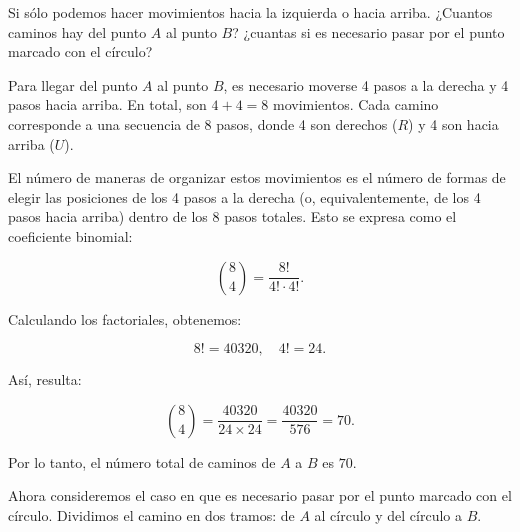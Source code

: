 \documentclass{article}
\begin{document}
\begin{enumerate}
\begin{center}
		
			
		\end{center}
		
			Si sólo podemos hacer movimientos hacia la izquierda o hacia arriba. ¿Cuantos caminos hay del punto $A$ al punto $B$? 			¿cuantas si es necesario pasar por el punto marcado con el círculo?


Para llegar del punto \(A\) al punto \(B\), es necesario moverse 4 pasos a la derecha y 4 pasos hacia arriba. En total, son \(4 + 4 = 8\) movimientos. Cada camino corresponde a una secuencia de 8 pasos, donde 4 son derechos (\(R\)) y 4 son hacia arriba (\(U\)).

El número de maneras de organizar estos movimientos es el número de formas de elegir las posiciones de los 4 pasos a la derecha (o, equivalentemente, de los 4 pasos hacia arriba) dentro de los 8 pasos totales. Esto se expresa como el coeficiente binomial:

\[
\binom{8}{4} = \frac{8!}{4! \cdot 4!}.
\]

Calculando los factoriales, obtenemos:

\[
8! = 40320, \quad 4! = 24.
\]

Así, resulta:

\[
\binom{8}{4} = \frac{40320}{24 \times 24} = \frac{40320}{576} = 70.
\]

Por lo tanto, el número total de caminos de \(A\) a \(B\) es \(70\).

\medskip

Ahora consideremos el caso en que es necesario pasar por el punto marcado con el círculo. Dividimos el camino en dos tramos: de \(A\) al círculo y del círculo a \(B\).


\end{enumerate}
\end{document}
